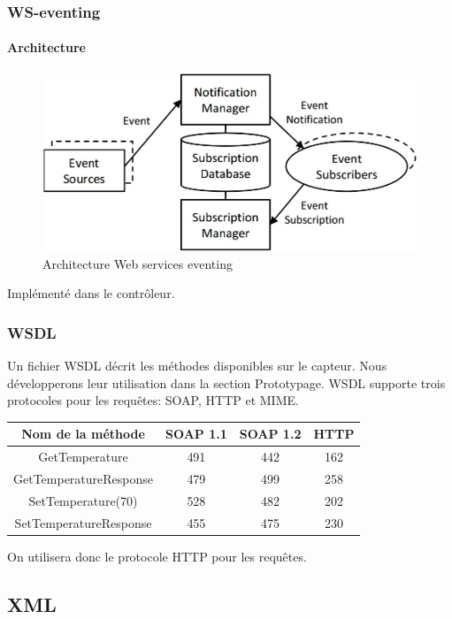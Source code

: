 \begin{frame}
 \frametitle{WS-eventing}
 \framesubtitle{Architecture}
 \begin{figure}
  \centering
  \includegraphics[scale=0.43]{figures/eventing.jpg}
  \caption{Architecture Web services eventing}
 \end{figure}
 Implémenté dans le contrôleur.
\end{frame}
\begin{frame}
 \frametitle{WSDL}
 Un fichier WSDL décrit les méthodes disponibles sur le capteur. Nous développerons leur utilisation dans la section Prototypage.
 WSDL supporte trois protocoles pour les requêtes: SOAP, HTTP et MIME.\\
 \vspace{5mm}
 \begin{center}
 \begin{tabular}{|c|c|c|c|}
 \hline
 Nom de la méthode & SOAP 1.1 & SOAP 1.2 & HTTP\\
 \hline
 GetTemperature & 491 & 442 & 162\\
 GetTemperatureResponse & 479 & 499 & 258\\
 SetTemperature(70) & 528 & 482 & 202\\
 SetTemperatureResponse & 455 & 475 & 230\\
 \hline
 \end{tabular}
 \end{center}
 \vspace{5mm}
 On utilisera donc le protocole HTTP pour les requêtes.
\end{frame}
\subsection{XML}
